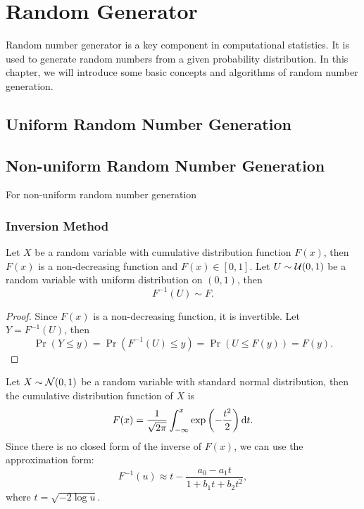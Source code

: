 \chapter{Random Generator}

Random number generator is a key component in computational statistics. It is used to generate random numbers from a given probability distribution. In this chapter, we will introduce some basic concepts and algorithms of random number generation.

\section{Uniform Random Number Generation}

\section{Non-uniform Random Number Generation}

For non-uniform random number generation

\subsection{Inversion Method}

\begin{theorem}
	Let \(X\) be a random variable with cumulative distribution function \(F(x)\), then \(F(x)\) is a non-decreasing function and \(F(x)\in[0,1]\). Let \(U\sim\mathcal{U}(0,1)\) be a random variable with uniform distribution on \((0,1)\), then
	\begin{equation}
		F^{-1}(U)\sim F.
	\end{equation}
\end{theorem}

\begin{proof}
	Since \(F(x)\) is a non-decreasing function, it is invertible. Let \(Y=F^{-1}(U)\), then
	\begin{equation*}
		\Pr(Y\leq y)=\Pr(F^{-1}(U)\leq y)=\Pr(U\leq F(y))=F(y).
	\end{equation*}
\end{proof}

\begin{example}
	Let \(X\sim\mathcal{N}(0,1)\) be a random variable with standard normal distribution, then the cumulative distribution function of \(X\) is
	\begin{equation}
		F(x)=\frac{1}{\sqrt{2\pi}}\int_{-\infty}^{x}\exp\left(-\frac{t^{2}}{2}\right)\mathop{}\!\mathrm{d} t.
	\end{equation}
	Since there is no closed form of the inverse of \(F(x)\), we can use the approximation form:
	\begin{equation}
		F^{-1}(u)\approx t-\frac{a_{0}-a_{1}t}{1+b_{1}t+b_{2}t^{2}},
	\end{equation}
	where \(t=\sqrt{-2\log u}\). %
\end{example}

